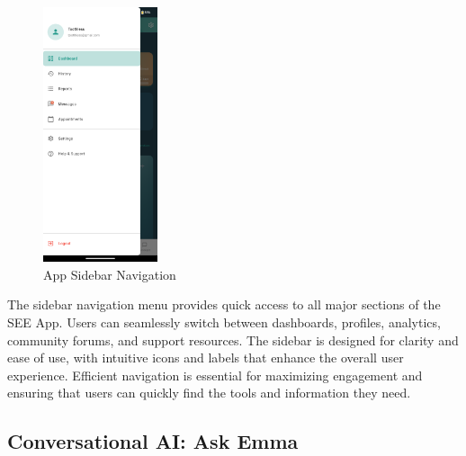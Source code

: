 \documentclass[12pt,a4paper]{article}
\newcommand{\sectiontitle}[1]{\subsection{#1}}
\begin{document}
\begin{figure}[H]
    \centering
    \includegraphics[width=0.3\textwidth]{Screenshots/sidebar.png}
    \caption{App Sidebar Navigation}
    \label{fig:sidebar}
\end{figure}
The sidebar navigation menu provides quick access to all major sections of the SEE App. Users can seamlessly switch between dashboards, profiles, analytics, community forums, and support resources. The sidebar is designed for clarity and ease of use, with intuitive icons and labels that enhance the overall user experience. Efficient navigation is essential for maximizing engagement and ensuring that users can quickly find the tools and information they need.

\sectiontitle{Conversational AI: Ask Emma}
\end{document}
